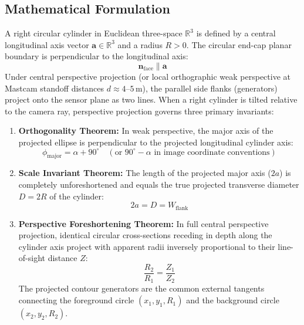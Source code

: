 \documentclass[11pt,a4paper]{article}
\begin{document}
\subsection{Mathematical Formulation}
A right circular cylinder in Euclidean three-space $\mathbb{R}^3$ is defined by a central longitudinal axis vector $\mathbf{a} \in \mathbb{R}^3$ and a radius $R > 0$. The circular end-cap planar boundary is perpendicular to the longitudinal axis:
\begin{equation}
    \mathbf{n}_{\text{face}} \parallel \mathbf{a}
\end{equation}
Under central perspective projection (or local orthographic weak perspective at Mastcam standoff distances $d \approx 4\text{--}5\,\text{m}$), the parallel side flanks (generators) project onto the sensor plane as two lines. When a right cylinder is tilted relative to the camera ray, perspective projection governs three primary invariants:
\begin{enumerate}
    \item \textbf{Orthogonality Theorem:} In weak perspective, the major axis of the projected ellipse is perpendicular to the projected longitudinal cylinder axis:
    \begin{equation}
        \phi_{\text{major}} = \alpha + 90^\circ \quad (\text{or } 90^\circ - \alpha \text{ in image coordinate conventions})
    \end{equation}
    \item \textbf{Scale Invariant Theorem:} The length of the projected major axis ($2a$) is completely unforeshortened and equals the true projected transverse diameter $D = 2R$ of the cylinder:
    \begin{equation}
        2a = D = W_{\text{flank}}
    \end{equation}
    \item \textbf{Perspective Foreshortening Theorem:} In full central perspective projection, identical circular cross-sections receding in depth along the cylinder axis project with apparent radii inversely proportional to their line-of-sight distance $Z$:
    \begin{equation}
        \frac{R_2}{R_1} = \frac{Z_1}{Z_2}
    \end{equation}
    The projected contour generators are the common external tangents connecting the foreground circle $(x_1, y_1, R_1)$ and the background circle $(x_2, y_2, R_2)$.
\end{enumerate}
\end{document}
